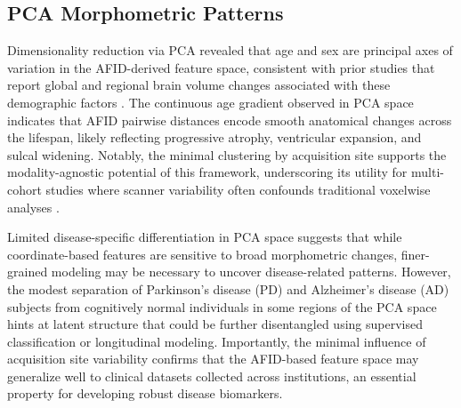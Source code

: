 \subsection{PCA Morphometric Patterns}
Dimensionality reduction via PCA revealed that age and sex are principal axes of variation in the AFID-derived feature space, consistent with prior studies that report global and regional brain volume changes associated with these demographic factors \cite{Fjell2010-aq, Ritchie2018-df}. The continuous age gradient observed in PCA space indicates that AFID pairwise distances encode smooth anatomical changes across the lifespan, likely reflecting progressive atrophy, ventricular expansion, and sulcal widening. Notably, the minimal clustering by acquisition site supports the modality-agnostic potential of this framework, underscoring its utility for multi-cohort studies where scanner variability often confounds traditional voxelwise analyses \cite{Fortin2018-ke}.

Limited disease-specific differentiation in PCA space suggests that while coordinate-based features are sensitive to broad morphometric changes, finer-grained modeling may be necessary to uncover disease-related patterns. However, the modest separation of Parkinson’s disease (PD) and Alzheimer’s disease (AD) subjects from cognitively normal individuals in some regions of the PCA space hints at latent structure that could be further disentangled using supervised classification or longitudinal modeling. Importantly, the minimal influence of acquisition site variability confirms that the AFID-based feature space may generalize well to clinical datasets collected across institutions, an essential property for developing robust disease biomarkers.


